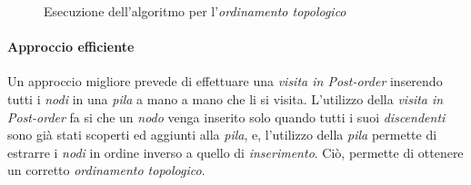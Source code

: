 \begin{figure}[h!]
    \ContinuedFloat
    \centering
    \caption{Esecuzione dell'algoritmo  per l'\emph{ordinamento topologico}}
\end{figure}

\paragraph{Approccio efficiente}
Un approccio migliore prevede di effettuare una \emph{visita in Post-order}
inserendo tutti i \emph{nodi} in una \emph{pila} a mano a mano che li si visita.
L'utilizzo della \emph{visita in Post-order} fa si che un \emph{nodo} venga
inserito solo quando tutti i suoi \emph{discendenti} sono già stati scoperti ed
aggiunti alla \emph{pila}, e, l'utilizzo della \emph{pila} permette di estrarre
i \emph{nodi} in ordine inverso a quello di \emph{inserimento}. Ciò, permette di
ottenere un corretto \emph{ordinamento topologico}.

